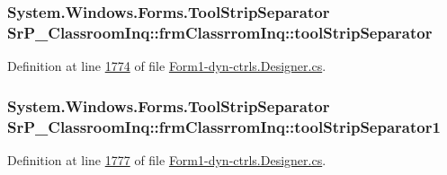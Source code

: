 \hypertarget{class_sr_p___classroom_inq_1_1frm_classrrom_inq_a442caa4a21bb4dac8b91d82e24bec584}{
\subsubsection[{tool\-Strip\-Separator}]{\setlength{\rightskip}{0pt plus 5cm}\-System.\-Windows.\-Forms.\-Tool\-Strip\-Separator {\bf \-Sr\-P\-\_\-\-Classroom\-Inq\-::frm\-Classrrom\-Inq\-::tool\-Strip\-Separator}}}
\label{class_sr_p___classroom_inq_1_1frm_classrrom_inq_a442caa4a21bb4dac8b91d82e24bec584}


\-Definition at line \hyperlink{_form1-dyn-ctrls_8_designer_8cs_source_l01774}{1774} of file \hyperlink{_form1-dyn-ctrls_8_designer_8cs_source}{\-Form1-\/dyn-\/ctrls.\-Designer.\-cs}.

\hypertarget{class_sr_p___classroom_inq_1_1frm_classrrom_inq_a3bec3b534d141382d4525a9be840e911}{
\subsubsection[{tool\-Strip\-Separator1}]{\setlength{\rightskip}{0pt plus 5cm}\-System.\-Windows.\-Forms.\-Tool\-Strip\-Separator {\bf \-Sr\-P\-\_\-\-Classroom\-Inq\-::frm\-Classrrom\-Inq\-::tool\-Strip\-Separator1}}}
\label{class_sr_p___classroom_inq_1_1frm_classrrom_inq_a3bec3b534d141382d4525a9be840e911}


\-Definition at line \hyperlink{_form1-dyn-ctrls_8_designer_8cs_source_l01777}{1777} of file \hyperlink{_form1-dyn-ctrls_8_designer_8cs_source}{\-Form1-\/dyn-\/ctrls.\-Designer.\-cs}.

